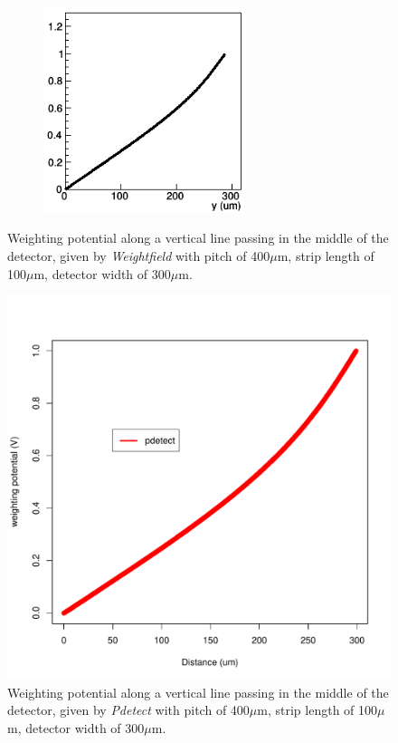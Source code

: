 \documentclass[11pt]{article}
\begin{document}
		\begin{figure}[H]
			\begin{minipage}[b]{.46\linewidth}
				\center
				\includegraphics[height=6cm, width=8cm]{images/boundary_conditions/weight_pot.png}
				\caption{Weighting potential along a vertical line passing in the middle of the detector,
						given by \textit{Weightfield} with pitch of 400$\mu$m, strip length of 100$\mu$m,
						detector width of 300$\mu$m.}
				\label{fig:weight_pot}
			\end{minipage} \hfill
			\begin{minipage}[b]{.46\linewidth}
			\center
				\includegraphics[scale=0.4]{images/boundary_conditions/free.pdf}
				\caption{Weighting potential along a vertical line passing in the middle of the detector,
						given by \textit{Pdetect} with pitch of 400$\mu$m, strip length of 100$\mu$m, detector
						width of 300$\mu$m.}
				\label{fig:free_conditions}
				\end{minipage}
		\end{figure}
\end{document}
